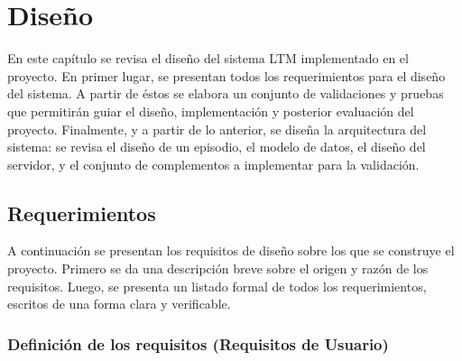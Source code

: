 \chapter{Diseño}\label{chapter:diseno}

En este capítulo se revisa el diseño del sistema LTM implementado en el proyecto. En primer lugar, se presentan todos los requerimientos para el diseño del sistema. A partir de éstos se elabora un conjunto de validaciones y pruebas que permitirán guiar el diseño, implementación y posterior evaluación del proyecto. Finalmente, y a partir de lo anterior, se diseña la arquitectura del sistema: se revisa el diseño de un episodio, el modelo de datos, el diseño del servidor, y el conjunto de complementos a implementar para la validación.
 

\section{Requerimientos}

A continuación se presentan los requisitos de diseño sobre los que se construye el proyecto. Primero se da una descripción breve sobre el origen y razón de los requisitos. Luego, se presenta un listado formal de todos los requerimientos, escritos de una forma clara y verificable.
 
\subsection{Definición de los requisitos (Requisitos de Usuario)}



